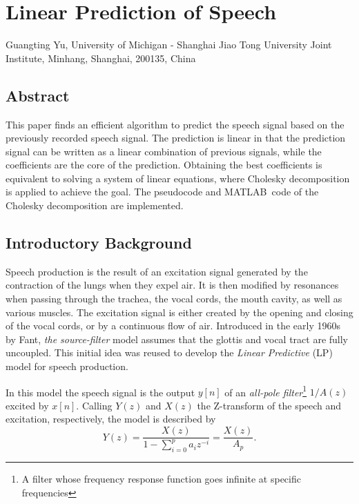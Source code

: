 \titleformat{\section}{\normalfont\Large\bfseries}{\thesection}{1em}{}
\renewcommand{\chaptername}{Project}
\renewcommand{\thesection}{\arabic{section}}


\chapter{Linear Prediction of Speech}
\begin{center}
Guangting Yu, University of Michigan - Shanghai Jiao Tong University Joint Institute, Minhang, Shanghai, 200135, China
\end{center}


\section*{Abstract}
This paper finds an efficient algorithm to predict the speech signal based on the previously recorded speech signal.
The prediction is linear in that the prediction signal can be written as a linear combination of previous signals, while the coefficients are the core of the prediction.
Obtaining the best coefficients is equivalent to solving a system of linear equations, where Cholesky decomposition is applied to achieve the goal.
The pseudocode and MATLAB\texttrademark\ code of the Cholesky decomposition are implemented.


\section{Introductory Background}
Speech production is the result of an excitation signal generated by the contraction of the lungs when they expel air.
It is then modified by resonances when passing through the trachea, the vocal cords, the mouth cavity, as well as various muscles.
The excitation signal is either created by the opening and closing of the vocal cords, or by a continuous flow of air.
Introduced in the early 1960s by Fant, \textit{the source-filter} model assumes that the glottis and vocal tract are fully uncoupled.
This initial idea was reused to develop the \textit{Linear Predictive} (LP) model for speech production.\cite{dutoit}

In this model the speech signal is the output \(y[n]\) of an \textit{all-pole filter}\footnote{A filter whose frequency response function goes infinite at specific frequencies} \(1/A(z)\) excited by \(x[n]\).
Calling \(Y(z)\) and \(X(z)\) the Z-transform of the speech and excitation, respectively, the model is described by
\begin{equation}
Y(z)=\frac{X(z)}{1-\sum_{i=0}^p a_i z^{-i}}=\frac{X(z)}{A_p}.
\end{equation}

